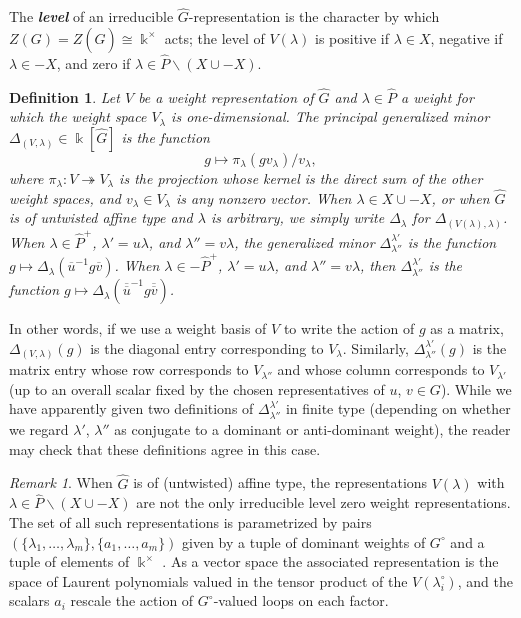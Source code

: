 \documentclass[12pt]{amsart}
\newcommand{\newword}[1]{\textbf{\emph{#1}}}
\newcommand{\kk}{\Bbbk}
\newcommand\onto{\twoheadrightarrow}
\newcommand{\ol}[1]{\overline{#1}}
\newcommand{\dol}[1]{\overline{\overline{#1}}}
\newtheorem{definition}[theorem]{Definition}
\theoremstyle{remark}
\newtheorem{remark}[theorem]{Remark}
\numberwithin{equation}{section}
\numberwithin{figure}{section}
\begin{document}
The \newword{level} of an irreducible $\widehat{G}$-representation is the character by which $Z(G) = Z(\widehat{G}) \cong \kk^\times$ acts; the level of $V(\lambda)$ is positive if $\lambda \in X$, negative if $\lambda \in -X$, and zero if $\lambda \in \widehat{P} \smallsetminus(X \cup -X)$.

\begin{definition}
  \label{def:minors}
  Let $V$ be a weight representation of $\widehat{G}$ and $\lambda \in \widehat{P}$ a weight for which the weight space $V_\lambda$ is one-dimensional.
  The principal generalized minor $\Delta_{(V,\lambda)} \in \kk[\widehat{G}]$ is the function 
  \[
    g \mapsto \pi_\lambda(gv_\lambda)/v_\lambda,
  \]
  where $\pi_\lambda:V \onto V_\lambda$ is the projection whose kernel is the direct sum of the other weight spaces, and $v_\lambda \in V_\lambda$ is any nonzero vector.
  When $\lambda \in X \cup -X$, or when $\widehat{G}$ is of untwisted affine type and $\lambda$ is arbitrary, we simply write $\Delta_\lambda$ for $\Delta_{(V(\lambda),\lambda)}$.
  When $\lambda \in \widehat{P}^+$, $\lambda' = u\lambda$, and $\lambda'' = v\lambda$, the generalized minor $\Delta^{\lambda'}_{\lambda''}$ is the function $g \mapsto \Delta_\lambda(\ol{u}^{-1}g\ol{v})$.
  When $\lambda \in -\widehat{P}^+$, $\lambda' = u\lambda$, and $\lambda'' = v\lambda$, then $\Delta^{\lambda'}_{\lambda''}$ is the function $g \mapsto \Delta_\lambda(\dol{u}^{-1}g\dol{v})$.
\end{definition}

In other words, if we use a weight basis of $V$ to write the action of $g$ as a matrix, $\Delta_{(V,\lambda)}(g)$ is the diagonal entry corresponding to $V_\lambda$.
Similarly, $\Delta^{\lambda'}_{\lambda''}(g)$ is the matrix entry whose row corresponds to $V_{\lambda''}$ and whose column corresponds to $V_{\lambda'}$ (up to an overall scalar fixed by the chosen representatives of $u$, $v \in G$).
While we have apparently given two definitions of $\Delta^{\lambda'}_{\lambda''}$ in finite type (depending on whether we regard $\lambda'$, $\lambda''$ as conjugate to a dominant or anti-dominant weight), the reader may check that these definitions agree in this case.

\begin{remark}
  When $\widehat{G}$ is of (untwisted) affine type, the representations $V(\lambda)$ with $\lambda \in \widehat{P}\smallsetminus(X \cup - X)$ are not the only irreducible level zero weight representations.
  The set of all such representations is parametrized by pairs $(\{\lambda_1,\dotsc,\lambda_m\},\{a_1,\dotsc,a_m\})$ given by a tuple of dominant weights of $G^\circ$ and a tuple of elements of $\kk^\times$ \cite{CP86}.
  As a vector space the associated representation is the space of Laurent polynomials valued in the tensor product of the $V(\lambda_i^\circ)$, and the scalars $a_i$ rescale the action of $G^\circ$-valued loops on each factor.
\end{remark}
\end{document}
